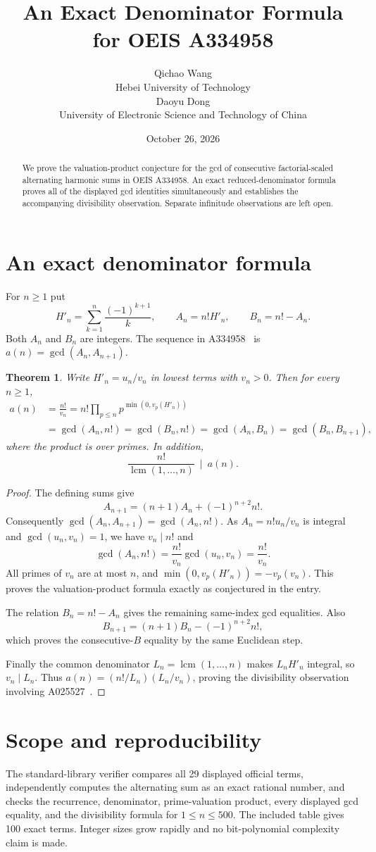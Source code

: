 \documentclass[10pt]{article}
\title{An Exact Denominator Formula for OEIS A334958}
\author{Qichao Wang\\{\small Hebei University of Technology}\\[0.3em]
Daoyu Dong\\{\small University of Electronic Science and Technology of China}}
\date{October 26, 2026}
\newtheorem{theorem}{Theorem}
\begin{document}
\maketitle
\begin{abstract}
We prove the valuation-product conjecture for the gcd of consecutive factorial-scaled alternating harmonic sums in OEIS A334958. An exact reduced-denominator formula proves all of the displayed gcd identities simultaneously and establishes the accompanying divisibility observation. Separate infinitude observations are left open.
\end{abstract}
\section{An exact denominator formula}
For $n\ge1$ put
\[
 H'_n=\sum_{k=1}^n\frac{(-1)^{k+1}}k,\qquad A_n=n!H'_n,\qquad B_n=n!-A_n.
\]
Both $A_n$ and $B_n$ are integers. The sequence in A334958~\cite{oeis} is $a(n)=\gcd(A_n,A_{n+1})$.
\begin{theorem}
Write $H'_n=u_n/v_n$ in lowest terms with $v_n>0$. Then for every $n\ge1$,
\begin{align*}
 a(n)&=\frac{n!}{v_n}
 =n!\prod_{p\le n}p^{\min(0,v_p(H'_n))}\\
 &=\gcd(A_n,n!)=\gcd(B_n,n!)=\gcd(A_n,B_n)
 =\gcd(B_n,B_{n+1}),
\end{align*}
where the product is over primes. In addition,
\[
 \frac{n!}{\operatorname{lcm}(1,\ldots,n)}\ \mid\ a(n).
\]
\end{theorem}
\begin{proof}
The defining sums give
\[
 A_{n+1}=(n+1)A_n+(-1)^{n+2}n!.
\]
Consequently $\gcd(A_n,A_{n+1})=\gcd(A_n,n!)$.
As $A_n=n!u_n/v_n$ is integral and $\gcd(u_n,v_n)=1$, we have $v_n\mid n!$ and
\[
 \gcd(A_n,n!)=\frac{n!}{v_n}\gcd(u_n,v_n)=\frac{n!}{v_n}.
\]
All primes of $v_n$ are at most $n$, and
$\min(0,v_p(H'_n))=-v_p(v_n)$. This proves the valuation-product formula exactly as conjectured in the entry.

The relation $B_n=n!-A_n$ gives the remaining same-index gcd equalities. Also
\[
 B_{n+1}=(n+1)B_n-(-1)^{n+2}n!,
\]
which proves the consecutive-$B$ equality by the same Euclidean step.

Finally the common denominator $L_n=\operatorname{lcm}(1,\ldots,n)$ makes $L_n H'_n$ integral, so $v_n\mid L_n$. Thus
$a(n)=(n!/L_n)(L_n/v_n)$, proving the divisibility observation involving A025527~\cite{lcm}.
\end{proof}
\section{Scope and reproducibility}
The standard-library verifier compares all 29 displayed official terms, independently computes the alternating sum as an exact rational number, and checks the recurrence, denominator, prime-valuation product, every displayed gcd equality, and the divisibility formula for $1\le n\le500$. The included table gives 100 exact terms. Integer sizes grow rapidly and no bit-polynomial complexity claim is made.
\end{document}
